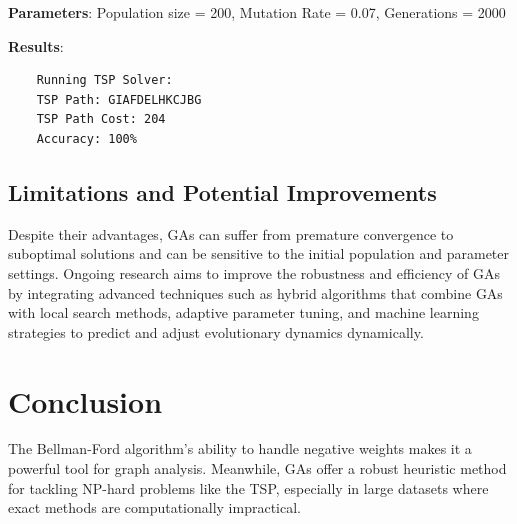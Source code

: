 \documentclass[12pt, a4paper]{article}
\begin{document}
\textbf{Parameters}: Population size = 200, Mutation Rate = 0.07, Generations =
2000

\textbf{Results}:
\begin{verbatim}
    Running TSP Solver:
    TSP Path: GIAFDELHKCJBG
    TSP Path Cost: 204
    Accuracy: 100%
\end{verbatim}

\subsection{Limitations and Potential Improvements}
Despite their advantages, GAs can suffer from premature convergence to
suboptimal solutions and can be sensitive to the initial population and
parameter settings. Ongoing research aims to improve the robustness and
efficiency of GAs by integrating advanced techniques such as hybrid algorithms
that combine GAs with local search methods, adaptive parameter tuning, and
machine learning strategies to predict and adjust evolutionary dynamics
dynamically.

\section{Conclusion}
The Bellman-Ford algorithm's ability to handle negative weights makes it a
powerful tool for graph analysis. Meanwhile, GAs offer a robust heuristic method
for tackling NP-hard problems like the TSP, especially in large datasets where
exact methods are computationally impractical.




\end{document}
